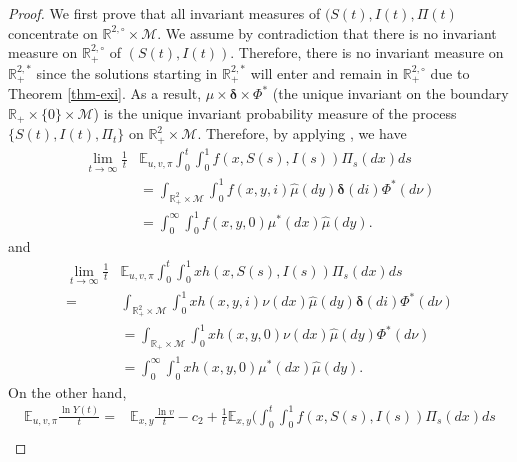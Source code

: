 \documentclass[12pt]{amsart}
\theoremstyle{remark}
\numberwithin{equation}{section}
\newcommand{\M}{\mathcal{M}}
\newcommand{\E}{\mathbb{E}}
\newcommand{\R}{\mathbb{R}}
\numberwithin{equation}{section}
\newcommand{\Ei}{\E_{u,v,\pi}}
\newcommand{\1}{\boldsymbol{1}}
\newcommand{\bmu}{\boldsymbol{\mu}}
\newcommand{\bdelta}{\boldsymbol{\delta}}
\def\hat{\widehat}
\begin{document}
\begin{proof}
	We first prove that all invariant measures of $(S(t),I(t),\Pi(t)$ concentrate on $\R^{2,\circ}\times\M$.
	We assume by contradiction that there is no invariant measure on $\R^{2,\circ}_+$ of $(S(t),I(t))$.
Therefore, there is no invariant measure on $\R^{2,*}_+$ since the solutions starting in $\R^{2,*}_+$ will enter and remain in $\R^{2,\circ}_+$ due to Theorem \ref{thm-exi}.
	As a result, $\hat\mu\times\bdelta\times\Phi^*$ (the unique invariant on the boundary $\R_+\times\{0\}\times\M$) is the unique invariant probability measure of the process $\{S(t),I(t),\Pi_t\}$ on $\R^2_+\times\M$.
	Therefore, by applying \cite[Lemma 3.4]{HN18}, we have
	\begin{equation}\label{limity}
	\begin{aligned}
	\lim_{t\to\infty} \frac1t&\Ei\int_0^t\int_0^1 f(x,S(s),I(s))\Pi_s(dx)ds\\
	&=\int_{\R^2_+\times\M} \int_0^1f(x,y,i)\hat\mu(dy)\bdelta(di)\Phi^*(d\nu)\\
	&=\int_0^\infty\int_0^1 f(x,y,0)\mu^*(dx)\hat\mu(dy).
	\end{aligned}
	\end{equation}
	and
	\begin{equation}\label{limitx}
	\begin{aligned}
	\lim_{t\to\infty} \frac1t&\Ei\int_0^t \int_0^1 xh(x,S(s),I(s))\Pi_s(dx)ds\\
	=&\int_{\R^2_+\times\M} \int_0^1xh(x,y,i)\nu(dx)\hat\mu(dy)\bdelta(di)\Phi^*(d\nu)\\
	&=\int_{\R_+\times\M} \int_0^1xh(x,y,0)\nu(dx)\hat\mu(dy)\Phi^*(d\nu)\\
	&=\int_0^\infty\int_0^1 xh(x,y,0)\mu^*(dx)\hat\mu(dy).
	\end{aligned}
	\end{equation}
	On the other hand,
	$$
	\begin{aligned}
	\Ei\frac{\ln Y(t)}t=&\E_{x,y}\frac{\ln v}t-c_2+\frac{1}{t}\E_{x,y}\bigg(\int_0^t \int_0^1f(x,S(s),I(s))\Pi_s(dx)ds\\

\end{aligned}$$
\end{proof}
\end{document}
